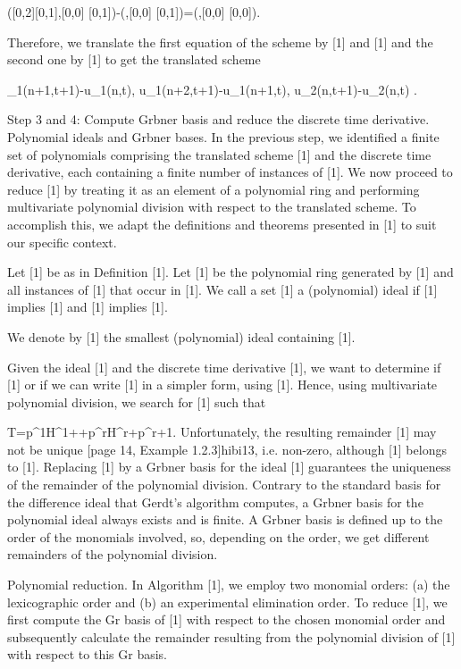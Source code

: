 \documentclass{article}
\begin{document}
{	
		([0,2][0,1],[0,0] [0,1])-(,[0,0] [0,1])=(,[0,0] [0,0]).
	
	Therefore, we translate the first equation of the scheme by [1] and [1] and the second one by [1] to get the translated scheme
	
	
		_1(n+1,t+1)-u_1(n,t),
		u_1(n+2,t+1)-u_1(n+1,t),
		u_2(n,t+1)-u_2(n,t)
		.
	


{Step 3 and 4: Compute Gr{}bner basis and reduce the discrete time derivative.}
{Polynomial ideals and Gr{}bner bases.}
In the previous step, we identified a finite set of polynomials comprising the translated scheme [1] and the discrete time derivative, each containing a finite number of instances of [1]. We now proceed to reduce [1] by treating it as an element of a polynomial ring and performing multivariate polynomial division with respect to the translated scheme. To accomplish this, we adapt the definitions and theorems presented in [1] to suit our specific context.

	Let [1] be as in Definition [1]. Let [1] be the polynomial ring generated by [1] and all instances of [1] that occur in [1].
	We call a set [1] a {(polynomial) ideal} if
	[1] implies [1] and
	[1] implies [1].


	We denote by [1] the smallest (polynomial) ideal containing [1].

Given the ideal [1] and the discrete time derivative [1], we want to determine if [1] or if we can write [1] in a simpler form, using [1].
Hence, using multivariate polynomial division, we search for [1] such that

	{T}=p^1H^1++p^rH^r+p^{r+1}.
Unfortunately, the resulting remainder [1] may not be unique [page 14, Example 1.2.3]{hibi13}, i.e. non-zero, although [1] belongs to [1]. 
Replacing [1] by a Gr{}bner basis for the ideal [1] guarantees the uniqueness of the remainder of the polynomial division. 
Contrary to the standard basis for the difference ideal that Gerdt's algorithm computes, a Gr{}bner basis for the polynomial ideal always exists and is finite.
A Gr{}bner basis is defined up to the order of the monomials involved, so, depending on the order, we get different remainders of the polynomial division.

{Polynomial reduction.}
In Algorithm [1], we employ two monomial orders: (a) the lexicographic order and (b) an experimental elimination order. To reduce [1], we first compute the Gr basis of [1] with respect to the chosen monomial order and subsequently calculate the remainder resulting from the polynomial division of [1] with respect to this Gr basis.

}
\end{document}
